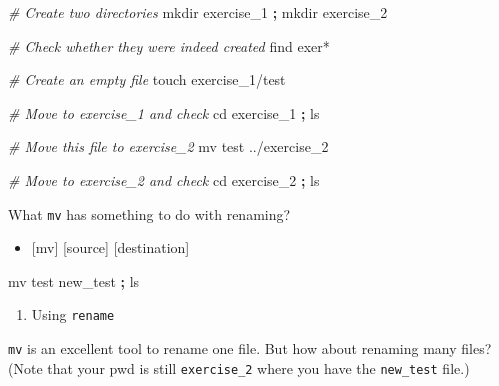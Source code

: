 \documentclass[
]{book}
\newenvironment{Shaded}{\begin{snugshade}}{\end{snugshade}}
\newcommand{\BuiltInTok}[1]{#1}
\newcommand{\CommentTok}[1]{\textcolor[rgb]{0.56,0.35,0.01}{\textit{#1}}}
\newcommand{\DataTypeTok}[1]{\textcolor[rgb]{0.13,0.29,0.53}{#1}}
\newcommand{\ExtensionTok}[1]{#1}
\newcommand{\FunctionTok}[1]{\textcolor[rgb]{0.00,0.00,0.00}{#1}}
\newcommand{\KeywordTok}[1]{\textcolor[rgb]{0.13,0.29,0.53}{\textbf{#1}}}
\newcommand{\NormalTok}[1]{#1}
\newcommand{\StringTok}[1]{\textcolor[rgb]{0.31,0.60,0.02}{#1}}
\newcommand{\VariableTok}[1]{\textcolor[rgb]{0.00,0.00,0.00}{#1}}
\providecommand{\tightlist}{%
  \setlength{\itemsep}{0pt}\setlength{\parskip}{0pt}}
\begin{document}
\begin{Shaded}
\begin{Highlighting}[]

\CommentTok{\# Create two directories }
\FunctionTok{mkdir}\NormalTok{ exercise\_1 }\KeywordTok{;} \FunctionTok{mkdir}\NormalTok{ exercise\_2 }

\CommentTok{\# Check whether they were indeed created }
\FunctionTok{find}\NormalTok{ exer*}

\CommentTok{\# Create an empty file }
\FunctionTok{touch}\NormalTok{ exercise\_1/test }

\CommentTok{\# Move to exercise\_1 and check }
\BuiltInTok{cd}\NormalTok{ exercise\_1 }\KeywordTok{;} \FunctionTok{ls} 

\CommentTok{\# Move this file to exercise\_2 }
\FunctionTok{mv}\NormalTok{ test ../exercise\_2 }

\CommentTok{\# Move to exercise\_2 and check }
\BuiltInTok{cd}\NormalTok{ exercise\_2 }\KeywordTok{;} \FunctionTok{ls} 
\end{Highlighting}
\end{Shaded}

What \texttt{mv} has something to do with renaming?

\begin{itemize}
\tightlist
\item
  {[}mv{]} {[}source{]} {[}destination{]}
\end{itemize}

\begin{Shaded}
\begin{Highlighting}[]

\FunctionTok{mv}\NormalTok{ test new\_test }\KeywordTok{;} \FunctionTok{ls} 
\end{Highlighting}
\end{Shaded}

\begin{enumerate}
\def\labelenumi{\arabic{enumi}.}
\setcounter{enumi}{1}
\tightlist
\item
  Using \texttt{rename}
\end{enumerate}

\texttt{mv} is an excellent tool to rename one file. But how about renaming many files? (Note that your pwd is still \texttt{exercise\_2} where you have the \texttt{new\_test} file.)

\begin{Shaded}
\end{Shaded}
\end{document}
